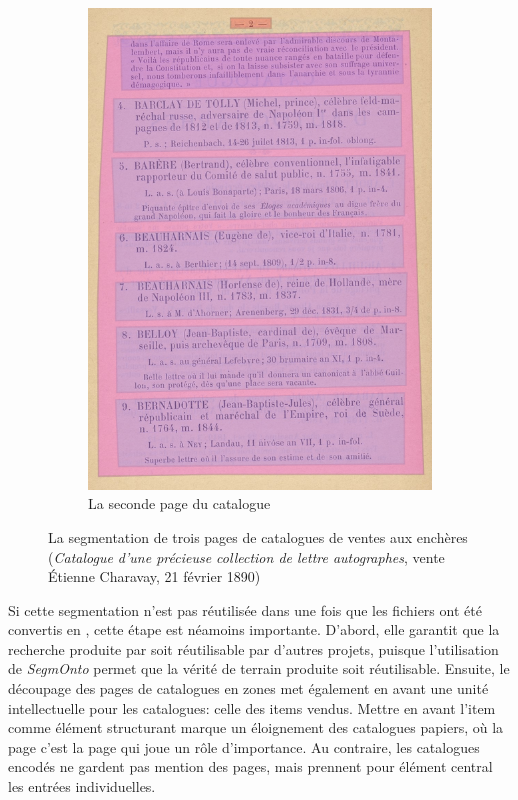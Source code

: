 \begin{figure}
\begin{subfigure}{0.33\textwidth}
		\includegraphics[width=\textwidth]{img/cat_000434_p2_zones.png}
		\caption{La seconde page du catalogue}
		\label{fig:catp2}
	\end{subfigure}
	\caption{La segmentation de trois pages de catalogues de ventes aux enchères (\textit{Catalogue d'une précieuse collection de lettre autographes}, vente Étienne Charavay, 21 février 1890)}
	\label{fig:catzones}
\end{figure}

Si cette segmentation n'est pas réutilisée dans une fois que les fichiers \alto{} ont été convertis en \tei{}, cette étape est néamoins importante. D'abord, elle garantit que la recherche produite par \mssktb{} soit réutilisable par d'autres projets, puisque l'utilisation de \textit{SegmOnto} permet que la vérité de terrain produite soit réutilisable. Ensuite, le découpage des pages de catalogues en zones met également en avant une unité intellectuelle pour les catalogues: celle des items vendus. Mettre en avant l'item comme élément structurant marque un éloignement des catalogues papiers, où la page c'est la page qui joue un rôle d'importance. Au contraire, les catalogues encodés ne gardent pas mention des pages, mais prennent pour élément central les entrées individuelles.


